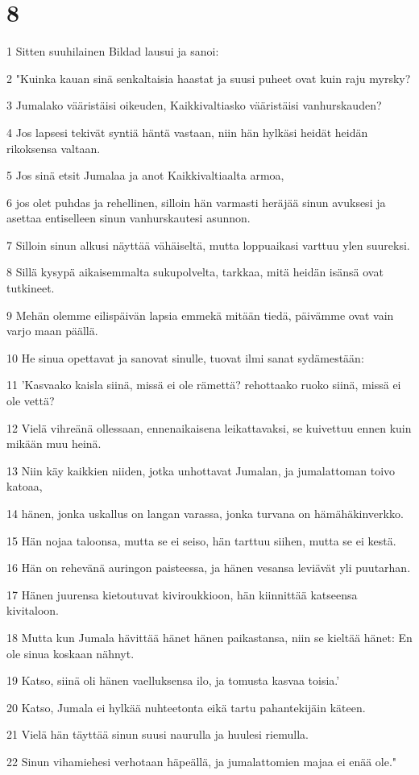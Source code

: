 \chapter{8}

\par 1 Sitten suuhilainen Bildad lausui ja sanoi:
\par 2 "Kuinka kauan sinä senkaltaisia haastat ja suusi puheet ovat kuin raju myrsky?
\par 3 Jumalako vääristäisi oikeuden, Kaikkivaltiasko vääristäisi vanhurskauden?
\par 4 Jos lapsesi tekivät syntiä häntä vastaan, niin hän hylkäsi heidät heidän rikoksensa valtaan.
\par 5 Jos sinä etsit Jumalaa ja anot Kaikkivaltiaalta armoa,
\par 6 jos olet puhdas ja rehellinen, silloin hän varmasti heräjää sinun avuksesi ja asettaa entiselleen sinun vanhurskautesi asunnon.
\par 7 Silloin sinun alkusi näyttää vähäiseltä, mutta loppuaikasi varttuu ylen suureksi.
\par 8 Sillä kysypä aikaisemmalta sukupolvelta, tarkkaa, mitä heidän isänsä ovat tutkineet.
\par 9 Mehän olemme eilispäivän lapsia emmekä mitään tiedä, päivämme ovat vain varjo maan päällä.
\par 10 He sinua opettavat ja sanovat sinulle, tuovat ilmi sanat sydämestään:
\par 11 'Kasvaako kaisla siinä, missä ei ole rämettä? rehottaako ruoko siinä, missä ei ole vettä?
\par 12 Vielä vihreänä ollessaan, ennenaikaisena leikattavaksi, se kuivettuu ennen kuin mikään muu heinä.
\par 13 Niin käy kaikkien niiden, jotka unhottavat Jumalan, ja jumalattoman toivo katoaa,
\par 14 hänen, jonka uskallus on langan varassa, jonka turvana on hämähäkinverkko.
\par 15 Hän nojaa taloonsa, mutta se ei seiso, hän tarttuu siihen, mutta se ei kestä.
\par 16 Hän on rehevänä auringon paisteessa, ja hänen vesansa leviävät yli puutarhan.
\par 17 Hänen juurensa kietoutuvat kiviroukkioon, hän kiinnittää katseensa kivitaloon.
\par 18 Mutta kun Jumala hävittää hänet hänen paikastansa, niin se kieltää hänet: En ole sinua koskaan nähnyt.
\par 19 Katso, siinä oli hänen vaelluksensa ilo, ja tomusta kasvaa toisia.'
\par 20 Katso, Jumala ei hylkää nuhteetonta eikä tartu pahantekijäin käteen.
\par 21 Vielä hän täyttää sinun suusi naurulla ja huulesi riemulla.
\par 22 Sinun vihamiehesi verhotaan häpeällä, ja jumalattomien majaa ei enää ole."

